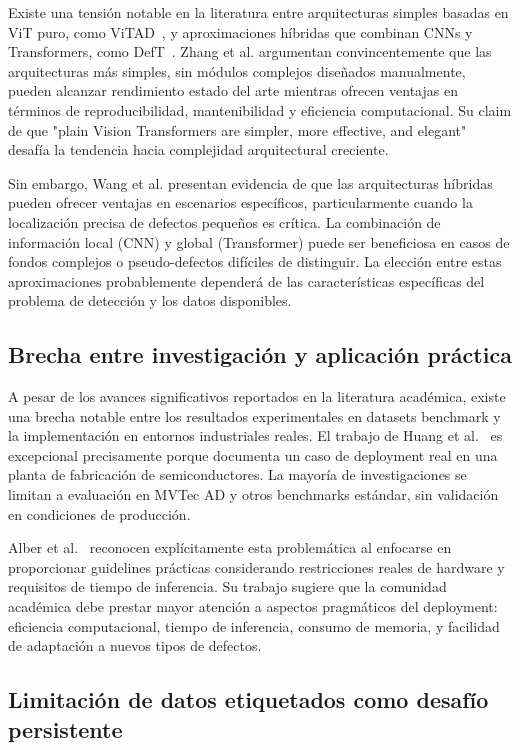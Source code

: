Existe una tensión notable en la literatura entre arquitecturas simples basadas en ViT puro, como ViTAD~\cite{zhang2025exploring}, y aproximaciones híbridas que combinan CNNs y Transformers, como DefT~\cite{wang2022defect}. Zhang et al. argumentan convincentemente que las arquitecturas más simples, sin módulos complejos diseñados manualmente, pueden alcanzar rendimiento estado del arte mientras ofrecen ventajas en términos de reproducibilidad, mantenibilidad y eficiencia computacional. Su claim de que "plain Vision Transformers are simpler, more effective, and elegant" desafía la tendencia hacia complejidad arquitectural creciente.

Sin embargo, Wang et al. presentan evidencia de que las arquitecturas híbridas pueden ofrecer ventajas en escenarios específicos, particularmente cuando la localización precisa de defectos pequeños es crítica. La combinación de información local (CNN) y global (Transformer) puede ser beneficiosa en casos de fondos complejos o pseudo-defectos difíciles de distinguir. La elección entre estas aproximaciones probablemente dependerá de las características específicas del problema de detección y los datos disponibles.

\subsection{Brecha entre investigación y aplicación práctica}

A pesar de los avances significativos reportados en la literatura académica, existe una brecha notable entre los resultados experimentales en datasets benchmark y la implementación en entornos industriales reales. El trabajo de Huang et al.~\cite{huang2025semiconductor} es excepcional precisamente porque documenta un caso de deployment real en una planta de fabricación de semiconductores. La mayoría de investigaciones se limitan a evaluación en MVTec AD y otros benchmarks estándar, sin validación en condiciones de producción.

Alber et al.~\cite{alber2024evaluating} reconocen explícitamente esta problemática al enfocarse en proporcionar guidelines prácticas considerando restricciones reales de hardware y requisitos de tiempo de inferencia. Su trabajo sugiere que la comunidad académica debe prestar mayor atención a aspectos pragmáticos del deployment: eficiencia computacional, tiempo de inferencia, consumo de memoria, y facilidad de adaptación a nuevos tipos de defectos.

\subsection{Limitación de datos etiquetados como desafío persistente}

